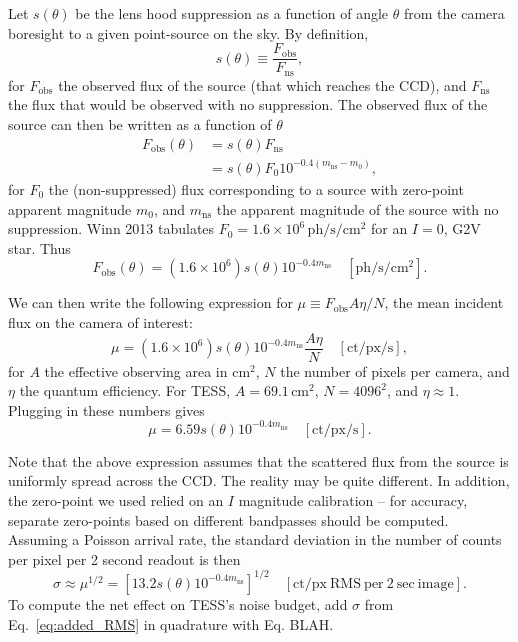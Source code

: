 \documentclass{article}
\begin{document}
Let $s(\theta)$ be the lens hood suppression as a function of angle $\theta$ 
from the camera boresight to a given point-source on the sky. By definition,
\begin{equation}
s(\theta) \equiv \frac{F_\mathrm{obs}}{F_\mathrm{ns}},
\end{equation}
for $F_\mathrm{obs}$ the observed flux of the source (that which reaches the 
CCD), and $F_\mathrm{ns}$ the flux that would be observed with no 
suppression.
The observed flux of the source can then be written as a function of $\theta$
\begin{align}
	F_\mathrm{obs}(\theta) &= s(\theta) F_\mathrm{ns}  \\
	&= s(\theta) F_0 10^{-0.4(m_\mathrm{ns} - m_0)} ,
\end{align}
for $F_0$ the (non-suppressed) flux corresponding to a source with zero-point 
apparent magnitude $m_0$, and $m_\mathrm{ns}$ the apparent magnitude of 
the source with no suppression.
Winn 2013 tabulates $F_0 = 1.6\times10^6\,\mathrm{ph/s/cm^2}$ 
for an $I=0$, G2V star.
Thus
\begin{equation}
F_\mathrm{obs}(\theta) = (1.6\times 10^6) s(\theta) 10^{-0.4 m_\mathrm{ns}} 
\quad \mathrm{[ph/s/cm^2]}.
\end{equation}

We can then write the following expression for $\mu\equiv F_\mathrm{obs} A \eta 
/ N$, the mean incident flux on the camera of interest:
\begin{equation}
\mu =  (1.6\times 10^6) s(\theta) 10^{-0.4 m_\mathrm{ns}} \frac{A 
\eta}{N} \quad \mathrm{[ct/px/s]},
\end{equation}
for $A$ the effective observing area in $\mathrm{cm^2}$, $N$ the 
number of pixels per camera, and $\eta$ the quantum efficiency.
For TESS, $A=69.1\,\mathrm{cm^2}$, $N=4096^2$, and $\eta\approx 1$. Plugging in 
these numbers gives
\begin{equation}
\mu = 6.59  s(\theta) 10^{-0.4 m_\mathrm{ns}}\quad 
\mathrm{[ct/px/s]}.
\end{equation}

Note that the above expression assumes that the scattered flux from the source 
is uniformly spread across the CCD. The reality may be quite different.
In addition, the zero-point we used relied on an $I$ magnitude calibration -- 
for accuracy, separate zero-points based on different bandpasses should be 
computed.
Assuming a Poisson arrival rate, the standard deviation in the number of counts 
per pixel per 2 second readout is then
\begin{equation}
\sigma \approx \mu^{1/2} = \left[ 13.2 s(\theta) 10^{-0.4 m_\mathrm{ns}} 
\right]^{1/2}\quad \mathrm{[ct/px\ RMS\ per\ 2\ sec\ image]}.
\label{eq:added_RMS}
\end{equation}
To compute the net effect on TESS's noise budget, add $\sigma$ from 
Eq.~\ref{eq:added_RMS} in quadrature with Eq. BLAH.
\end{document}

